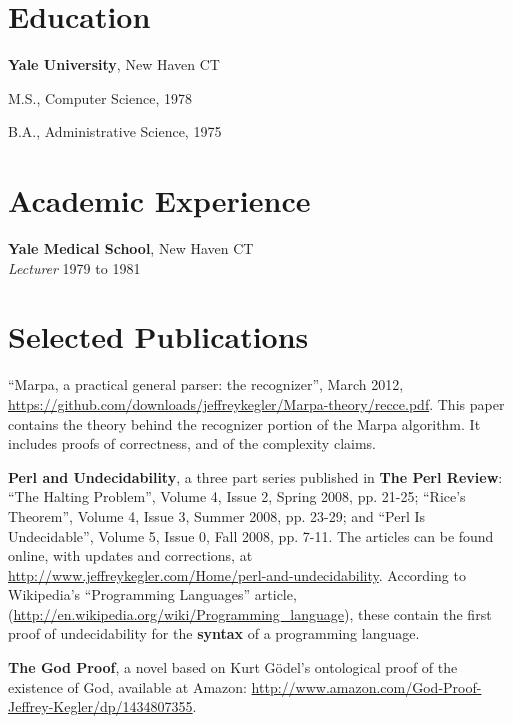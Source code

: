 \documentclass[12pt,margin,line]{res}
\newenvironment{mylist}{
  \begin{list}{}
  {%
      \setlength{\itemsep}{0in}%
      \setlength{\leftmargin}{0.2in}%
      \setlength{\parsep}{0in}%
      \setlength{\parskip}{0in}%
      \setlength{\partopsep}{0in}%
      \setlength{\topsep}{0in}%
  }
}
{\end{list}}
\begin{document}
\address{\url{http:://www.jeffreykegler.com/}}

\begin{resume}

\section{\sc Education}
{\bf Yale University}, New Haven CT
\begin{mylist}
\item[] M.S., Computer Science,  1978
\item[] B.A., Administrative Science,  1975
\end{mylist}

\section{\sc Academic Experience}
{\bf Yale Medical School}, New Haven CT \\
{\em Lecturer} \hfill 1979 to 1981\\
\vspace{-.2in}

\section{\sc Selected Publications}

``Marpa, a practical general parser: the recognizer'',
March 2012,
\url{https://github.com/downloads/jeffreykegler/Marpa-theory/recce.pdf}.
This paper contains the theory behind the
recognizer portion of the
Marpa algorithm.
It includes proofs of correctness, and of the complexity claims.

{\bf Perl and Undecidability}, a three part series published
in {\bf The Perl Review}:
``The Halting Problem'', Volume 4, Issue 2, Spring 2008, pp. 21-25;
``Rice's Theorem'', Volume 4, Issue 3, Summer 2008, pp. 23-29; and
``Perl Is Undecidable'', Volume 5, Issue 0, Fall 2008, pp. 7-11.
The articles can be found online, with updates and corrections,
at \url{http://www.jeffreykegler.com/Home/perl-and-undecidability}.
According to Wikipedia's ``Programming Languages'' article,
(\url{http://en.wikipedia.org/wiki/Programming_language}),
these contain the first proof of undecidability for the {\bf syntax}
of a programming language.

{\bf The God Proof},
a novel based on Kurt G\"{o}del's
ontological proof of the existence
of God,
available at Amazon:
\url{http://www.amazon.com/God-Proof-Jeffrey-Kegler/dp/1434807355}.


\end{resume}
\end{document}
